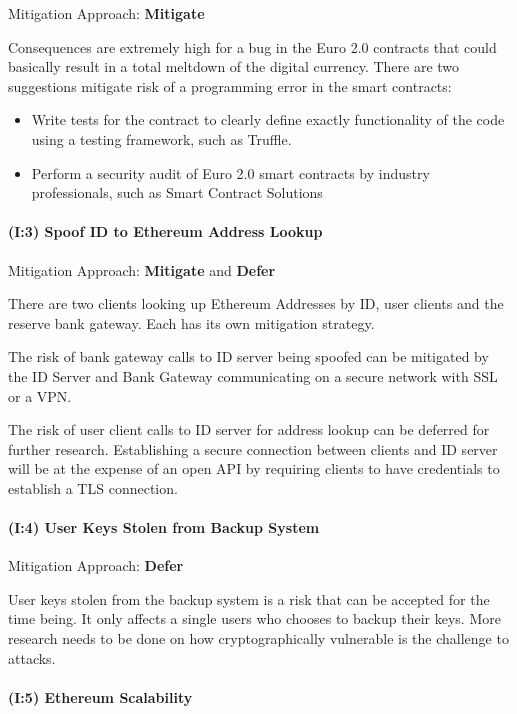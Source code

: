 \documentclass[12pt]{article} %
\begin{document}
{Mitigation Approach: \textbf{Mitigate}

Consequences are extremely high for a bug in the Euro 2.0 contracts that could basically result in a total meltdown of the digital currency. There are two suggestions mitigate risk of a programming error in the smart contracts:
\begin{itemize}
	\item Write tests for the contract to clearly define exactly functionality of the code using a testing framework, such as Truffle\cite{ethereumTruffle}.
	\item Perform a security audit of Euro 2.0 smart contracts by industry professionals, such as Smart Contract Solutions\cite{smartContractSolutions}
\end{itemize}

\paragraph{(I:3) Spoof ID to Ethereum Address Lookup}

Mitigation Approach: \textbf{Mitigate} and \textbf{Defer}

There are two clients looking up Ethereum Addresses by ID, user clients and the reserve bank gateway. Each has its own mitigation strategy.

The risk of bank gateway calls to ID server being spoofed can be mitigated by the ID Server and Bank Gateway communicating on a secure network with SSL or a VPN.

The risk of user client calls to ID server for address lookup can be deferred for further research. Establishing a secure connection between clients and ID server will be at the expense of an open API by requiring clients to have credentials to establish a TLS connection.

\paragraph{(I:4) User Keys Stolen from Backup System}

Mitigation Approach: \textbf{Defer}

User keys stolen from the backup system is a risk that can be accepted for the time being. It only affects a single users who chooses to backup their keys. More research needs to be done on how cryptographically vulnerable is the challenge to attacks.

\paragraph{(I:5) Ethereum Scalability}

}
\end{document}
